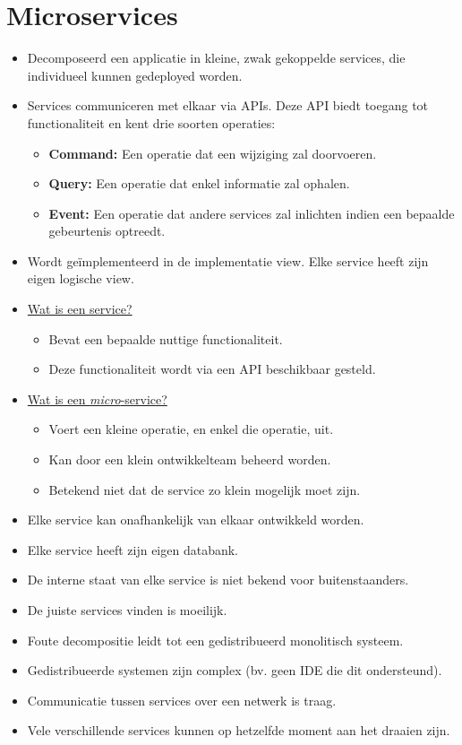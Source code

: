 	\section{Microservices}
		\begin{itemize}
			\item[\info] Decomposeerd een applicatie in kleine, zwak gekoppelde services, die individueel kunnen gedeployed worden.
			\item[\info] Services communiceren met elkaar via APIs. Deze API biedt toegang tot functionaliteit en kent drie soorten operaties:
			\begin{itemize}
				\item[\info] \textbf{Command:} Een operatie dat een wijziging zal doorvoeren.
				\item[\info] \textbf{Query:} Een operatie dat enkel informatie zal ophalen. 
				\item[\info] \textbf{Event:} Een operatie dat andere services zal inlichten indien een bepaalde gebeurtenis optreedt.
			\end{itemize}
			\item[\info] Wordt geïmplementeerd in de implementatie view. Elke service heeft zijn eigen logische view.
			\item[\info] \uline{Wat is een service?}
			\begin{itemize}
				\item[\info] Bevat een bepaalde nuttige functionaliteit.
				\item[\info] Deze functionaliteit wordt via een API beschikbaar gesteld. 
			\end{itemize}
			\item[\info] \uline{Wat is een \emph{micro}-service?}
			\begin{itemize}
				\item[\info] Voert een kleine operatie, en enkel die operatie, uit. 
				\item[\info] Kan door een klein ontwikkelteam beheerd worden.
				\item[\alert] Betekend niet dat de service zo klein mogelijk moet zijn.
			\end{itemize}
			\item[\good] Elke service kan onafhankelijk van elkaar ontwikkeld worden.
			\item[\good] Elke service heeft zijn eigen databank.
			\item[\good] De interne staat van elke service is niet bekend voor buitenstaanders. 
			\item[\alert] De juiste services vinden is moeilijk.
			\item[\alert] Foute decompositie leidt tot een gedistribueerd monolitisch systeem.
			\item[\alert] Gedistribueerde systemen zijn complex (bv. geen IDE die dit ondersteund).
			\item[\alert] Communicatie tussen services over een netwerk is traag.
			\item[\alert] Vele verschillende services kunnen op hetzelfde moment aan het draaien zijn. 
		\end{itemize}

